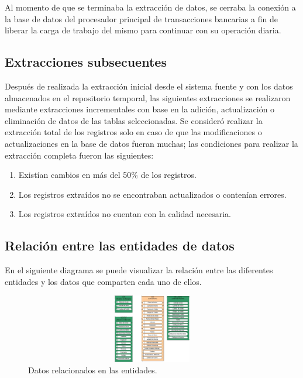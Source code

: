 Al momento de que se terminaba la extracción de datos, se cerraba la conexión a
la base de datos del procesador principal de transacciones bancarias a fin de
liberar la carga de trabajo del mismo para continuar con su operación diaria.

\subsection{Extracciones subsecuentes}

Después de realizada la extracción inicial desde el sistema fuente y con los
datos almacenados en el repositorio temporal, las siguientes extracciones se
realizaron mediante extracciones incrementales con base en la adición,
actualización o eliminación de datos de las tablas seleccionadas. Se consideró
realizar la extracción total de los registros solo en caso de que las
modificaciones o actualizaciones en la base de datos fueran muchas; las
condiciones para realizar la extracción completa fueron las siguientes:

\begin{enumerate}
\item Existían cambios en más del 50\% de los registros.
\item Los registros extraídos no se encontraban actualizados o contenían
  errores.
\item Los registros extraídos no cuentan con la calidad necesaria.
\end{enumerate}

\subsection{Relación entre las entidades de datos}

En el siguiente diagrama se puede visualizar la relación entre las diferentes
entidades y los datos que comparten cada uno de ellos.

\begin{figure}[htb]
  \begin{center}
    \includegraphics[width=12cm, height=3cm, scale=0.5]{Relacion_entidades.jpg}
        \caption{Datos relacionados en las entidades.}
    \label{fig:datos-relacionados-en-las-entidades}
  \end{center}
\end{figure}

